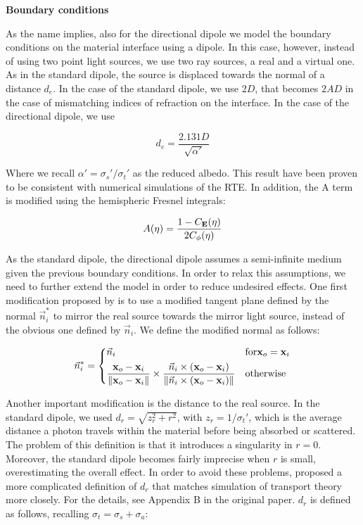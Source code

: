 \textbf{Boundary conditions}

As the name implies, also for the directional dipole we model the boundary conditions on the material interface using a dipole. In this case, however, instead of using two point light sources, we use two ray sources, a real and a virtual one. As in the standard dipole, the source is displaced towards the normal of a distance $d_e$. In the case of the standard dipole, we use $2D$, that becomes $2 A D$ in the case of mismatching indices of refraction on the interface. In the case of the directional dipole, we use 

$$
d_e = \frac{2.131 D}{\sqrt{\alpha'}}
$$ 

Where we recall $\alpha' = \sigma_s' / \sigma_t'$ as the reduced albedo. This result have been proven \citep{ntt} to be consistent with numerical simulations of the RTE. In addition, the A term is modified using the hemispheric Fresnel integrals:

$$
A(\eta) = \frac{1 - C_{\mathbf{E}}(\eta)}{2 C_{\phi}(\eta)}
$$

As the standard dipole, the directional dipole assumes a semi-infinite medium given the previous boundary conditions. In order to relax this assumptions, we need to further extend the model in order to reduce undesired effects. One first modification proposed by \cite{IMM2013-06646} is to use a modified tangent plane defined by the normal $\vec{n}_i^*$ to mirror the real source towards the mirror light source, instead of the obvious one defined by $\vec{n}_i$. We define the modified normal as follows:

$$
\vec{n}_i^* = 
\begin{dcases} 
\vec{n}_i & \text{for} \mathbf{x}_o = \mathbf{x}_i \\
\frac{\mathbf{x}_o - \mathbf{x}_i}{\|\mathbf{x}_o - \mathbf{x}_i\|} \times \frac{\vec{n}_i \times (\mathbf{x}_o - \mathbf{x}_i)}{\|\vec{n}_i \times (\mathbf{x}_o - \mathbf{x}_i)\|} & \text{otherwise}
\end{dcases}
$$

Another important modification is the distance to the real source. In the standard dipole, we used $d_r = \sqrt{z_r^2 + r^2}$, with $z_r = 1 / \sigma_t'$, which is the average distance a photon travels within the material before being absorbed or scattered. The problem of this definition is that it introduces a singularity in $r = 0$. Moreover, the standard dipole becomes fairly imprecise when $r$ is small, overestimating the overall effect. In order to avoid these problems, \cite{IMM2013-06646} proposed a more complicated definition of $d_r$ that matches simulation of transport theory more closely. For the details, see Appendix B in the original paper. $d_r$ is defined as follows, recalling $\sigma_t = \sigma_s + \sigma_a$:

